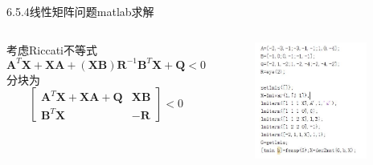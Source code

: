 \documentclass[10pt]{beamer}
\begin{document}
  \begin{frame}[allowframebreaks]{6.5.4线性矩阵问题matlab求解}


	\begin{columns}[T]
  
    考虑Riccati不等式
    \[\boldsymbol{A}^{T}\boldsymbol{X}+\boldsymbol{X}\boldsymbol{A}+\left ( \boldsymbol{X}\boldsymbol{B}\right )\boldsymbol{R}^{-1} \boldsymbol{B}^{T}\boldsymbol{X}+\boldsymbol{Q}< 0\]
    分块为\[\begin{bmatrix}
    \boldsymbol{A}^{T}\boldsymbol{X}+\boldsymbol{X}\boldsymbol{A}+\boldsymbol{Q} &\boldsymbol{X}\boldsymbol{B} \\ 
    \boldsymbol{B}^{T}\boldsymbol{X} & -\boldsymbol{R}
    \end{bmatrix}< 0\]
    

    \begin{figure}[htp]
      \centering
      \includegraphics[width=0.9\textwidth]{51.jpeg}
      \caption{}
    \end{figure}
	\end{columns}


  
  \end{frame}
  
\end{document}
